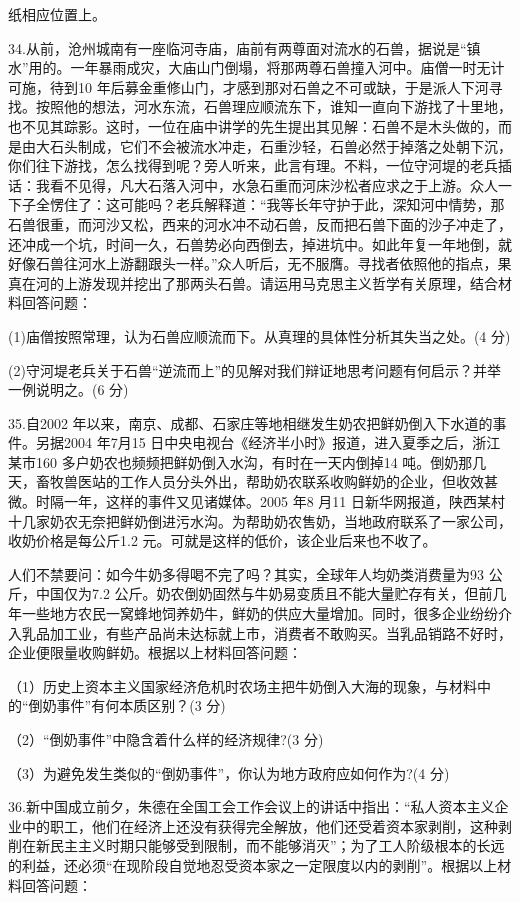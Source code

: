 \documentclass[UTF8,11pt]{ctexart}
\begin{document}
纸相应位置上。


34.从前，沧州城南有一座临河寺庙，庙前有两尊面对流水的石兽，据说是“镇水”用的。一年暴雨成灾，大庙山门倒塌，将那两尊石兽撞入河中。庙僧一时无计可施，待到10 年后募金重修山门，才感到那对石兽之不可或缺，于是派人下河寻找。按照他的想法，河水东流，石兽理应顺流东下，谁知一直向下游找了十里地，也不见其踪影。这时，一位在庙中讲学的先生提出其见解：石兽不是木头做的，而是由大石头制成，它们不会被流水冲走，石重沙轻，石兽必然于掉落之处朝下沉，你们往下游找，怎么找得到呢？旁人听来，此言有理。不料，一位守河堤的老兵插话：我看不见得，凡大石落入河中，水急石重而河床沙松者应求之于上游。众人一下子全愣住了：这可能吗？老兵解释道：“我等长年守护于此，深知河中情势，那石兽很重，而河沙又松，西来的河水冲不动石兽，反而把石兽下面的沙子冲走了，还冲成一个坑，时间一久，石兽势必向西倒去，掉进坑中。如此年复一年地倒，就好像石兽往河水上游翻跟头一样。”众人听后，无不服膺。寻找者依照他的指点，果真在河的上游发现并挖出了那两头石兽。请运用马克思主义哲学有关原理，结合材料回答问题：


(1)庙僧按照常理，认为石兽应顺流而下。从真理的具体性分析其失当之处。(4 分)


(2)守河堤老兵关于石兽“逆流而上”的见解对我们辩证地思考问题有何启示？并举一例说明之。(6 分)


35.自2002 年以来，南京、成都、石家庄等地相继发生奶农把鲜奶倒入下水道的事件。另据2004 年7月15 日中央电视台《经济半小时》报道，进入夏季之后，浙江某市160 多户奶农也频频把鲜奶倒入水沟，有时在一天内倒掉14 吨。倒奶那几天，畜牧兽医站的工作人员分头外出，帮助奶农联系收购鲜奶的企业，但收效甚微。时隔一年，这样的事件又见诸媒体。2005 年8 月11 日新华网报道，陕西某村十几家奶农无奈把鲜奶倒进污水沟。为帮助奶农售奶，当地政府联系了一家公司，收奶价格是每公斤1.2 元。可就是这样的低价，该企业后来也不收了。

人们不禁要问：如今牛奶多得喝不完了吗？其实，全球年人均奶类消费量为93 公斤，中国仅为7.2 公斤。奶农倒奶固然与牛奶易变质且不能大量贮存有关，但前几年一些地方农民一窝蜂地饲养奶牛，鲜奶的供应大量增加。同时，很多企业纷纷介入乳品加工业，有些产品尚未达标就上市，消费者不敢购买。当乳品销路不好时，企业便限量收购鲜奶。根据以上材料回答问题：

（1）历史上资本主义国家经济危机时农场主把牛奶倒入大海的现象，与材料中的“倒奶事件”有何本质区别？(3 分)


（2）“倒奶事件”中隐含着什么样的经济规律?(3 分)


（3）为避免发生类似的“倒奶事件”，你认为地方政府应如何作为?(4 分)


36.新中国成立前夕，朱德在全国工会工作会议上的讲话中指出：“私人资本主义企业中的职工，他们在经济上还没有获得完全解放，他们还受着资本家剥削，这种剥削在新民主主义时期只能够受到限制，而不能够消灭”；为了工人阶级根本的长远的利益，还必须“在现阶段自觉地忍受资本家之一定限度以内的剥削”。根据以上材料回答问题：
\end{document}

